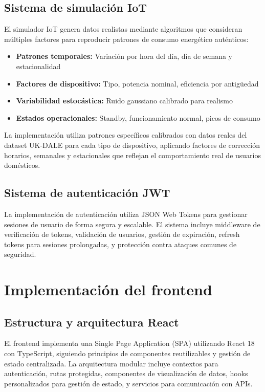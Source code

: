 \subsection{Sistema de simulación IoT}

El simulador IoT genera datos realistas mediante algoritmos que consideran múltiples factores para reproducir patrones de consumo energético auténticos:

\begin{itemize}
    \item \textbf{Patrones temporales:} Variación por hora del día, día de semana y estacionalidad
    \item \textbf{Factores de dispositivo:} Tipo, potencia nominal, eficiencia por antigüedad  
    \item \textbf{Variabilidad estocástica:} Ruido gaussiano calibrado para realismo
    \item \textbf{Estados operacionales:} Standby, funcionamiento normal, picos de consumo
\end{itemize}

La implementación utiliza patrones específicos calibrados con datos reales del dataset UK-DALE para cada tipo de dispositivo, aplicando factores de corrección horarios, semanales y estacionales que reflejan el comportamiento real de usuarios domésticos.

\subsection{Sistema de autenticación JWT}

La implementación de autenticación utiliza JSON Web Tokens para gestionar sesiones de usuario de forma segura y escalable. El sistema incluye middleware de verificación de tokens, validación de usuarios, gestión de expiración, refresh tokens para sesiones prolongadas, y protección contra ataques comunes de seguridad.

\section{Implementación del frontend}

\subsection{Estructura y arquitectura React}

El frontend implementa una Single Page Application (SPA) utilizando React 18 con TypeScript, siguiendo principios de componentes reutilizables y gestión de estado centralizada. La arquitectura modular incluye contextos para autenticación, rutas protegidas, componentes de visualización de datos, hooks personalizados para gestión de estado, y servicios para comunicación con APIs.


